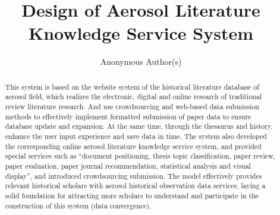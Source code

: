 \documentclass[sigchi, review]{acmart}
\begin{document}
	\title{Design of Aerosol Literature Knowledge Service System}
	\subtitle{Anonymous Author(s)}

\begin{comment}
	\author{Kejun Zhang}
	\affiliation{%
		\institution{State Key Lab of CAD\&CG, Zhejiang University}
		\streetaddress{38, Zheda Road}
		\city{Hangzhou}
		\state{China}
		\postcode{310027}
	}
	\email{zhangkejun@zju.edu.cn}
	
	\author{Xiaoyi Huang}
	\affiliation{%
		\institution{State Key Lab of CAD\&CG, Zhejiang University}
		\streetaddress{38, Zheda Road}
		\city{Hangzhou}
		\state{China}
		\postcode{310027}
	}
	\email{choyeehuang@gmail.com}
	
	\author{Jun Zheng}
	\affiliation{%
		\institution{State Key Lab of CAD\&CG, Zhejiang University}
		\streetaddress{38, Zheda Road}
		\city{Hangzhou}
		\state{China}
		\postcode{310027}
	}
	\email{zzjderry@gmail.com}
\end{comment} 
	
	\renewcommand{\shortauthors}{B. Trovato et al.}
	
	
	\begin{abstract}
		This system is based on the website system of the historical literature database of aerosol field, which realizes the electronic, digital and online research of traditional review literature research. And use crowdsourcing and web-based data submission methods to effectively implement formatted submission of paper data to ensure database update and expansion. At the same time, through the thesaurus and history, enhance the user input experience and save data in time. The system also developed the corresponding online aerosol literature knowledge service system, and provided special services such as “document positioning, thesis topic classification, paper review, paper evaluation, paper journal recommendation, statistical analysis and visual display”, and introduced crowdsourcing submission. The model effectively provides relevant historical scholars with aerosol historical observation data services, laying a solid foundation for attracting more scholars to understand and participate in the construction of this system (data convergence).
	\end{abstract}
	
\end{document}
